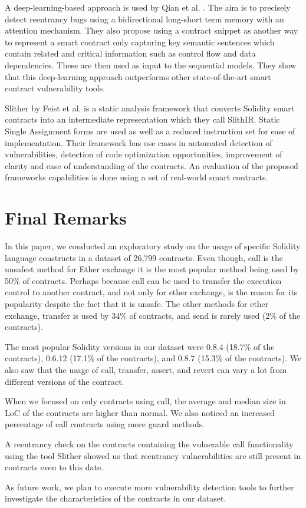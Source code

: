 \documentclass[10pt,conference]{IEEEtran}
\newcommand{\totalContracts}{26,799\xspace}
\begin{document}
A deep-learning-based approach is used by Qian et al. \cite{automated}. The aim is to precisely detect reentrancy bugs using a bidirectional long-short term memory with an attention mechanism. They also propose using a contract snippet as another way to represent a smart contract only capturing key semantic sentences which contain related and critical information such as control flow and data dependencies. These are then used as input to the sequential models. They show that this deep-learning approach outperforms other state-of-the-art smart contract vulnerability tools.

Slither by Feist et al. \cite{slither} is a static analysis framework that converts Solidity smart contracts into an intermediate representation which they call SlithIR. Static Single Assignment forms are used as well as a reduced instruction set for ease of implementation. Their framework has use cases in automated detection of vulnerabilities, detection of code optimization opportunities, improvement of clarity and ease of understanding of the contracts. An evaluation of the proposed frameworks capabilities is done using a set of real-world smart contracts. 

\section{Final Remarks}

In this paper, we conducted an exploratory study on the usage of specific Solidity language constructs in a dataset of \totalContracts contracts. Even though, call is the unsafest method for Ether exchange it is the most popular method being used by 50\% of contracts. Perhaps because call can be used to transfer the execution control to another contract, and not only for ether exchange, is the reason for its popularity despite the fact that it is unsafe. The other methods for ether exchange, transfer is used by 34\% of contracts, and send is rarely used (2\% of the contracts).

The most popular Solidity versions in our dataset were 0.8.4 (18.7\% of the contracts), 0.6.12 (17.1\% of the contracts), and 0.8.7 (15.3\% of the contracts). We also saw that the usage of call, transfer, assert, and revert can vary a lot from different versions of the contract.

When we focused on only contracts using call, the average and median size in LoC of the contracts are higher than normal. We also noticed an increased percentage of call contracts using more guard methods.

A reentrancy check on the contracts containing the vulnerable call functionality using the tool Slither showed us that reentrancy vulnerabilities are still present in contracts even to this date.  

As future work, we plan to execute more vulnerability detection tools to further investigate the characteristics of the contracts in our dataset.






\end{document}
